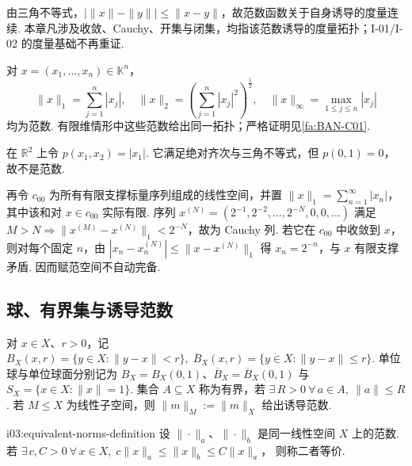 由三角不等式，\(\displaystyle |\|x\|-\|y\||\leqslant\|x-y\|\)，故范数函数关于自身诱导的度量连续. 本章凡涉及收敛、Cauchy、开集与闭集，均指该范数诱导的度量拓扑；I-01/I-02 的度量基础不再重证.

\begin{FAExample}[有限维标准范数]
对 \(\displaystyle x=(x_1,\dots,x_n)\in\mathbb K^n\)，
\[
\|x\|_1=\sum_{j=1}^{n}|x_j|,
\quad
\|x\|_2=\left(\sum_{j=1}^{n}|x_j|^2\right)^{\frac{1}{2}},
\quad
\|x\|_\infty=\max_{1\leqslant j\leqslant n}|x_j|
\]
均为范数. 有限维情形中这些范数给出同一拓扑；严格证明见\autoref{fa:BAN-C01}.
\end{FAExample}

\begin{FACounterexample}[正定性与完备性均不可省略]
在 \(\displaystyle \mathbb R^2\) 上令 \(\displaystyle p(x_1,x_2)=|x_1|\). 它满足绝对齐次与三角不等式，但 \(\displaystyle p(0,1)=0\)，故不是范数.

再令 \(\displaystyle c_{00}\) 为所有有限支撑标量序列组成的线性空间，并置 \(\displaystyle \|x\|_1=\sum_{n=1}^{\infty}|x_n|\)，其中该和对 \(\displaystyle x\in c_{00}\) 实际有限. 序列 \(\displaystyle x^{(N)}=(2^{-1},2^{-2},\dots,2^{-N},0,0,\dots)\)
满足 \(\displaystyle M>N\Rightarrow\|x^{(M)}-x^{(N)}\|_1<2^{-N}\)，故为 Cauchy 列. 若它在 \(\displaystyle c_{00}\) 中收敛到 \(\displaystyle x\)，则对每个固定 \(\displaystyle n\)，由 \(\displaystyle |x_n-x_n^{(N)}|\leqslant\|x-x^{(N)}\|_1\) 得 \(\displaystyle x_n=2^{-n}\)，与 \(\displaystyle x\) 有限支撑矛盾. 因而赋范空间不自动完备.
\end{FACounterexample}

\subsection{球、有界集与诱导范数}

对 \(\displaystyle x\in X\)、\(\displaystyle r>0\)，记 \(\displaystyle B_X(x,r)=\{y\in X:\|y-x\|<r\}, \; \overline B_X(x,r)=\{y\in X:\|y-x\|\leqslant r\}\).
单位球与单位球面分别记为 \(\displaystyle B_X=B_X(0,1)\)、\(\displaystyle \overline B_X=\overline B_X(0,1)\) 与 \(\displaystyle S_X=\{x\in X:\|x\|=1\}\). 集合 \(\displaystyle A\subseteq X\) 称为有界，若 \(\displaystyle \exists\,R>0\ \forall\,a\in A,\ \|a\|\leqslant R\). 若 \(\displaystyle M\leqslant X\) 为线性子空间，则 \(\displaystyle \|m\|_M:=\|m\|_X\) 给出诱导范数.

\begin{FADefinition}[C][等价范数]{i03:equivalent-norms-definition}
设 \(\displaystyle \|\cdot\|_a\)、\(\displaystyle \|\cdot\|_b\) 是同一线性空间 \(\displaystyle X\) 上的范数. 若 \(\displaystyle \exists\,c,C>0\ \forall\,x\in X,\; c\|x\|_a\leqslant\|x\|_b\leqslant C\|x\|_a\)，
则称二者等价.
\end{FADefinition}

